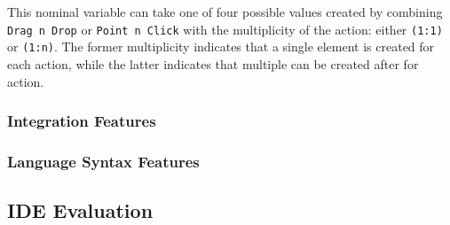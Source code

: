 This nominal variable can take one of four possible values created by
combining \texttt{Drag n Drop} or \texttt{Point n Click} with the
multiplicity of the action: either \texttt{(1:1)} or \texttt{(1:n)}. The
former multiplicity indicates that a single element is created for each
action, while the latter indicates that multiple can be created after for
action.


\subsubsection{Integration Features} \label{subsubsec:integration}
\subsubsection{Language Syntax Features} \label{subsubsec:languagesyntax}


\subsection{IDE Evaluation} \label{subsec:ideevaluation}
